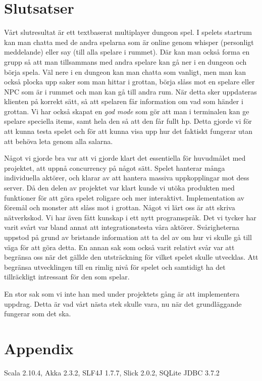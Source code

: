 \documentclass[a4paper]{article}
\begin{document}
\section{Slutsatser}
Vårt slutresultat är ett textbaserat multiplayer dungeon spel. I spelets startrum kan man chatta med de andra spelarna som är online genom whisper (personligt meddelande) eller say (till alla spelare i rummet). Där kan man också forma en grupp så att man tillsammans med andra spelare kan gå ner i en dungeon och börja spela. Väl nere i en dungeon kan man chatta som vanligt, men man kan också plocka upp saker som man hittar i grottan, börja slåss mot en spelare eller NPC som är i rummet och man kan gå till andra rum. När detta sker uppdateras klienten på korrekt sätt, så att spelaren får information om vad som händer i grottan.
Vi har också skapat en \textit{god mode} som gör att man i terminalen kan ge spelare speciella items, samt hela den så att den får fullt hp. Detta gjorde vi för att kunna testa spelet och för att kunna visa upp hur det faktiskt fungerar utan att behöva leta genom alla salarna.     

Något vi gjorde bra var att vi gjorde klart det essentiella för huvudmålet med projektet, att uppnå concurrency på något sätt. Spelet hanterar många individuella aktörer, och klarar av att hantera massiva uppkopplingar mot dess server. 
Då den delen av projektet var klart kunde vi utöka produkten med funktioner för att göra spelet roligare och mer interaktivt. 
Implementation av föremål och monster att slåss mot i grottan. 
Något vi lärt oss är att skriva nätverkskod. Vi har även fått kunskap i ett nytt programspråk.
Det vi tycker har varit svårt var bland annat att integrationstesta våra aktörer. Svårigheterna uppstod på grund av bristande 
information att ta del av om hur vi skulle gå till väga för att göra detta. En annan sak som också varit relativt svår var att 
begränsa oss när det gällde den utsträckning för vilket spelet skulle utvecklas. Att begränsa utvecklingen till en rimlig nivå för spelet 
och samtidigt ha det tillräckligt intressant för den som spelar.

En stor sak som vi inte han med under projektets gång är att implementera uppdrag. Detta är vad vårt nästa stek skulle vara, nu när det grundläggande fungerar som det ska. 

\section{Appendix}

Scala 2.10.4, Akka 2.3.2, SLF4J 1.7.7, Slick 2.0.2, SQLite JDBC 3.7.2
\end{document}
